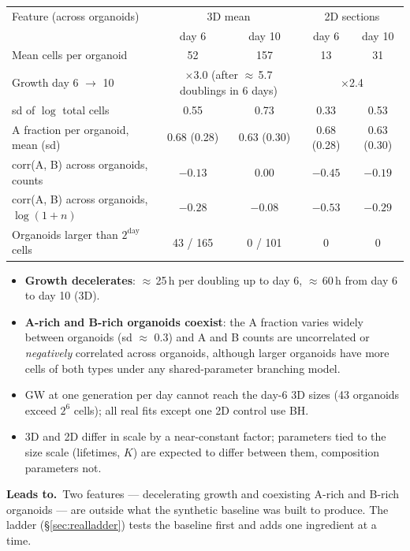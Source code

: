 \documentclass[10pt,a4paper]{article}
\newcommand{\blk}[1]{\par\needspace{5\baselineskip}\smallskip{\sffamily\bfseries\color{inkgray}#1}\par}
\newcommand{\Comment}{\blk{Comment}}
\newcommand{\Leads}[1]{\begin{leadbox}{\sffamily\bfseries\color{caqua!70!black}Leads to.}\ #1\end{leadbox}}
\renewcommand{\blk}[1]{\par\Needspace*{5\baselineskip}\smallskip{\sffamily\bfseries\color{inkgray}#1}\par}
\newcommand{\sref}[1]{\S\ref{#1}}
\begin{document}
\begin{center}\footnotesize
\begin{tabular}{@{}lcccc@{}}\toprule
Feature (across organoids) & \multicolumn{2}{c}{3D mean} & \multicolumn{2}{c}{2D sections} \\
 & day 6 & day 10 & day 6 & day 10 \\\midrule
Mean cells per organoid & 52 & 157 & 13 & 31 \\
Growth day 6 $\to$ 10 & \multicolumn{2}{c}{$\times$3.0 (after $\approx$\,5.7 doublings in 6 days)} & \multicolumn{2}{c}{$\times$2.4} \\
sd of $\log$ total cells & 0.55 & 0.73 & 0.33 & 0.53 \\
A fraction per organoid, mean (sd) & 0.68 (0.28) & 0.63 (0.30) & 0.68 (0.28) & 0.63 (0.30) \\
corr(A, B) across organoids, counts & $-0.13$ & 0.00 & $-0.45$ & $-0.19$ \\
corr(A, B) across organoids, $\log(1+n)$ & $-0.28$ & $-0.08$ & $-0.53$ & $-0.29$ \\
Organoids larger than $2^{\text{day}}$ cells & 43 / 165 & 0 / 101 & 0 & 0 \\\bottomrule
\end{tabular}
\end{center}
\Comment
\begin{itemize}
\item \textbf{Growth decelerates}: $\approx$\,25\,h per doubling up to day 6, $\approx$\,60\,h from day 6 to day 10 (3D).
\item \textbf{A-rich and B-rich organoids coexist}: the A fraction varies widely between organoids (sd $\approx$ 0.3) and A and B counts are uncorrelated or \emph{negatively} correlated across organoids, although larger organoids have more cells of both types under any shared-parameter branching model.
\item GW at one generation per day cannot reach the day-6 3D sizes (43 organoids exceed $2^6$ cells); all real fits except one 2D control use BH.
\item 3D and 2D differ in scale by a near-constant factor; parameters tied to the size scale (lifetimes, $K$) are expected to differ between them, composition parameters not.
\end{itemize}
\Leads{Two features --- decelerating growth and coexisting A-rich and B-rich organoids --- are outside what the synthetic baseline was built to produce. The ladder (\sref{sec:realladder}) tests the baseline first and adds one ingredient at a time.}
\end{document}
